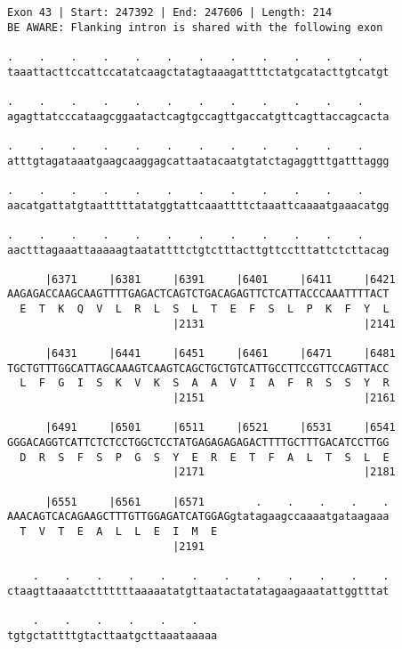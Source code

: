 \documentclass{article}
\begin{document}
\newpage
\begin{Verbatim}
Exon 43 | Start: 247392 | End: 247606 | Length: 214
BE AWARE: Flanking intron is shared with the following exon
 
.    .    .    .    .    .    .    .    .    .    .    .    
taaattacttccattccatatcaagctatagtaaagattttctatgcatacttgtcatgt
  
.    .    .    .    .    .    .    .    .    .    .    .    
agagttatcccataagcggaatactcagtgccagttgaccatgttcagttaccagcacta
  
.    .    .    .    .    .    .    .    .    .    .    .    
atttgtagataaatgaagcaaggagcattaatacaatgtatctagaggtttgatttaggg
  
.    .    .    .    .    .    .    .    .    .    .    .    
aacatgattatgtaatttttatatggtattcaaattttctaaattcaaaatgaaacatgg
  
.    .    .    .    .    .    .    .    .    .    .    .    
aactttagaaattaaaaagtaatattttctgtctttacttgttcctttattctcttacag
  
      |6371     |6381     |6391     |6401     |6411     |6421
AAGAGACCAAGCAAGTTTTGAGACTCAGTCTGACAGAGTTCTCATTACCCAAATTTTACT
  E  T  K  Q  V  L  R  L  S  L  T  E  F  S  L  P  K  F  Y  L
                          |2131                         |2141
  
      |6431     |6441     |6451     |6461     |6471     |6481
TGCTGTTTGGCATTAGCAAAGTCAAGTCAGCTGCTGTCATTGCCTTCCGTTCCAGTTACC
  L  F  G  I  S  K  V  K  S  A  A  V  I  A  F  R  S  S  Y  R
                          |2151                         |2161
  
      |6491     |6501     |6511     |6521     |6531     |6541
GGGACAGGTCATTCTCTCCTGGCTCCTATGAGAGAGAGACTTTTGCTTTGACATCCTTGG
  D  R  S  F  S  P  G  S  Y  E  R  E  T  F  A  L  T  S  L  E
                          |2171                         |2181
  
      |6551     |6561     |6571        .    .    .    .    .
AAACAGTCACAGAAGCTTTGTTGGAGATCATGGAGgtatagaagccaaaatgataagaaa
  T  V  T  E  A  L  L  E  I  M  E                           
                          |2191                             
  
    .    .    .    .    .    .    .    .    .    .    .    .
ctaagttaaaatctttttttaaaaatatgttaatactatatagaagaaatattggtttat
  
    .    .    .    .    .    .   
tgtgctattttgtacttaatgcttaaataaaaa
\end{Verbatim}
\newpage
\end{document}
